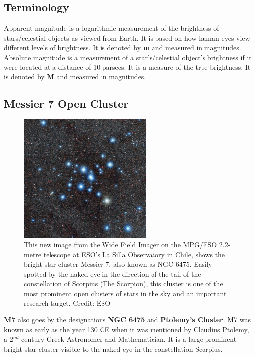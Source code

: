 \documentclass[12pt]{article}
\begin{document}
		\subsection{Terminology}
		Apparent magnitude is a logarithmic measurement of the brightness of stars/celestial objects as viewed from Earth. It is based on how human eyes view different levels of brightness. It is denoted by \textbf{m} and measured in magnitudes.\\
		Absolute magnitude is a measurement of a star's/celestial object's brightness if it were located at a distance of 10 parsecs. It is a measure of the true brightness. It is denoted by \textbf{M} and measured in magnitudes.
		\subsection{Messier 7 Open Cluster}
		\begin{figure}
			\includegraphics[width=0.58\textwidth]{m7_eso_0}
			\caption{This new image from the Wide Field Imager on the MPG/ESO 2.2-metre telescope at ESO’s La Silla Observatory in Chile, shows the bright star cluster Messier 7, also known as NGC 6475. Easily spotted by the naked eye in the direction of the tail of the constellation of Scorpius (The Scorpion), this cluster is one of the most prominent open clusters of stars in the sky and an important research target. \cite{eso_m7} Credit: ESO}
			\label{fig: m7}
		\end{figure}
		\textbf{M7} also goes by the designations \textbf{NGC 6475} and \textbf{Ptolemy's Cluster}. M7 was known as early as the year 130 CE when it was mentioned by Claudius Ptolemy, a 2$^{nd}$ century Greek Astronomer and Mathematician. It is a large prominent bright star cluster visible to the naked eye in the constellation Scorpius.\\
\end{document}
